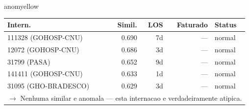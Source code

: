 \documentclass[a4paper,10pt]{article}
\begin{document}
\begin{anomalycard}[Internacao 99971 | GHO-PETROBRAS | MODERADO (z=2.16)]{anomyellow}
\begin{tabular}{l r r r l}\toprule\textbf{Intern.} & \textbf{Simil.} & \textbf{LOS} & \textbf{Faturado} & \textbf{Status} \\\midrule
111328 (GOHOSP-CNU) & 0.690 & 7d & --- & \textcolor{jcubeblue}{normal} \\
12072 (GOHOSP-CNU) & 0.686 & 3d & --- & \textcolor{jcubeblue}{normal} \\
31799 (PASA) & 0.652 & 9d & --- & \textcolor{jcubeblue}{normal} \\
141411 (GOHOSP-CNU) & 0.633 & 1d & --- & \textcolor{jcubeblue}{normal} \\
31095 (GHO-BRADESCO) & 0.629 & 3d & --- & \textcolor{jcubeblue}{normal} \\
\multicolumn{5}{l}{\textcolor{jcubeblue}{\small $\rightarrow$ Nenhuma similar e anomala --- esta internacao e verdadeiramente atipica.}} \\
\bottomrule\end{tabular}


\end{anomalycard}

\newpage
\end{document}
